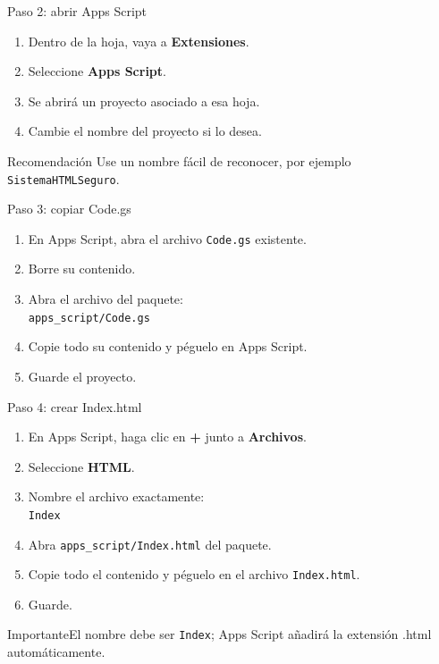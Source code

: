 \documentclass[aspectratio=169,11pt]{beamer}
\newcommand{\boton}[1]{\textcolor{azul}{\textbf{#1}}}
\newcommand{\ruta}[1]{\texttt{#1}}
\newcommand{\alertbox}[1]{\begin{block}{Importante}#1\end{block}}
\begin{document}
\begin{frame}{Paso 2: abrir Apps Script}
\begin{enumerate}
  \item Dentro de la hoja, vaya a \boton{Extensiones}.
  \item Seleccione \boton{Apps Script}.
  \item Se abrirá un proyecto asociado a esa hoja.
  \item Cambie el nombre del proyecto si lo desea.
\end{enumerate}
\begin{block}{Recomendación}
Use un nombre fácil de reconocer, por ejemplo \ruta{SistemaHTMLSeguro}.
\end{block}
\end{frame}

\begin{frame}{Paso 3: copiar Code.gs}
\begin{enumerate}
  \item En Apps Script, abra el archivo \ruta{Code.gs} existente.
  \item Borre su contenido.
  \item Abra el archivo del paquete:\\
  \ruta{apps\_script/Code.gs}
  \item Copie todo su contenido y péguelo en Apps Script.
  \item Guarde el proyecto.
\end{enumerate}
\end{frame}

\begin{frame}{Paso 4: crear Index.html}
\begin{enumerate}
  \item En Apps Script, haga clic en \boton{+} junto a \boton{Archivos}.
  \item Seleccione \boton{HTML}.
  \item Nombre el archivo exactamente:\\
  \ruta{Index}
  \item Abra \ruta{apps\_script/Index.html} del paquete.
  \item Copie todo el contenido y péguelo en el archivo \ruta{Index.html}.
  \item Guarde.
\end{enumerate}
\alertbox{El nombre debe ser \ruta{Index}; Apps Script añadirá la extensión .html automáticamente.}
\end{frame}
\end{document}
